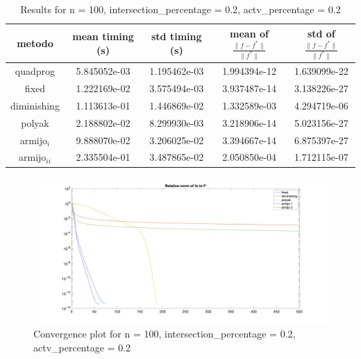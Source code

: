
\begin{table}[H]
\setlength{\tabcolsep}{10pt} %
\renewcommand{\arraystretch}{1.2} %
\centering
\begin{tabular}{|ccccc|}
\hline
\multicolumn{1}{|c||}{metodo}   & \multicolumn{1}{c|}{mean timing (s)}    & \multicolumn{1}{c|}{std timing (s)} & \multicolumn{1}{c|}{mean of $\frac{\|f - f^*\|}{\|f^*\|}$}   & std of $\frac{\|f - f^*\|}{\|f^*\|}$ \\ \hline\hline
\multicolumn{1}{|c||}{quadprog} & \multicolumn{1}{c|}{5.845052e-03} & \multicolumn{1}{c|}{1.195462e-03}  & \multicolumn{1}{c|}{1.994394e-12} & 1.639099e-22 \\ \hline\hline
\multicolumn{1}{|c||}{fixed}       & \multicolumn{1}{c|}{1.222169e-02} & \multicolumn{1}{c|}{3.575494e-03}  & \multicolumn{1}{c|}{3.937487e-14} & 3.138226e-27  \\ \hline
\multicolumn{1}{|c||}{diminishing} & \multicolumn{1}{c|}{1.113613e-01} & \multicolumn{1}{c|}{1.446869e-02}  & \multicolumn{1}{c|}{1.332589e-03} & 4.294719e-06 \\ \hline
\multicolumn{1}{|c||}{polyak} & \multicolumn{1}{c|}{2.188802e-02} & \multicolumn{1}{c|}{8.299930e-03}  & \multicolumn{1}{c|}{3.218906e-14} & 5.023156e-27 \\ \hline
\multicolumn{1}{|c||}{armijo$_i$} & \multicolumn{1}{c|}{9.888070e-02} & \multicolumn{1}{c|}{3.206025e-02}  & \multicolumn{1}{c|}{3.394667e-14} & 6.875397e-27 \\ \hline
\multicolumn{1}{|c||}{armijo$_{ii}$} & \multicolumn{1}{c|}{2.335504e-01} & \multicolumn{1}{c|}{3.487865e-02}  & \multicolumn{1}{c|}{2.050850e-04} & 1.712115e-07 \\ \hline
\end{tabular}
\caption{Results for n = 100, intersection\_percentage = 0.2, actv\_percentage = 0.2}
\label{tab:100_zerodue_zerodue}
\end{table}


\begin{figure}[H]
\centering
    \includegraphics[width=20cm, center]{./plots/plot_100_zerodue_zerodue.png}
    \caption{Convergence plot for n = 100, intersection\_percentage = 0.2, actv\_percentage = 0.2}
    \label{fig:100_zerodue_zerodue}
\end{figure} 



